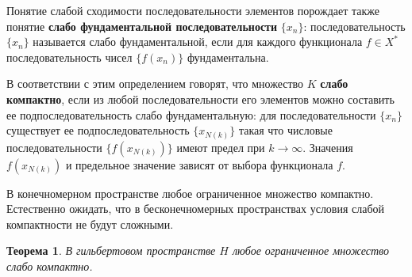 \documentclass[12pt,a4paper,titlepage,oneside]{book}
\theoremstyle{definition}
\theoremstyle{plain}
\newtheorem*{theorem}{Теорема}
\theoremstyle{break}
\theoremstyle{remark}
\theoremstyle{remark}
\theoremstyle{remark}
\theoremstyle{remark}
\theoremstyle{plain}
\theoremstyle{plain}
\begin{document}
Понятие слабой сходимости последовательности элементов порождает также понятие \textbf{слабо фундаментальной последовательности} $\{x_n\}$: последовательность $\{x_n\}$ называется слабо фундаментальной, если для каждого функционала $f \in X^*$ последовательность чисел $\{f(x_n)\}$ фундаментальна.

В соответствии с этим определением говорят, что множество $K$ \textbf{слабо компактно}, если из любой последовательности его элементов можно составить ее подпоследовательность слабо фундаментальную: для последовательности $\{x_n\}$ существует ее подпоследовательность $\{x_{N(k)}\}$ такая что числовые последовательности $\{f(x_{N(k)})\}$ имеют предел при $k \rightarrow \infty$. Значения $f(x_{N(k)})$ и предельное значение зависят от выбора функционала $f$.

В конечномерном пространстве любое ограниченное множество компактно. Естественно ожидать, что в бесконечномерных пространствах условия слабой компактности не будут сложными.

\begin{theorem}
В гильбертовом пространстве $H$ любое ограниченное множество слабо компактно.
\end{theorem}
\end{document}
